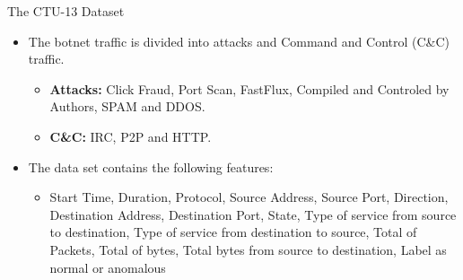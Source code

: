 \documentclass[newPxFont, numfooter, sectionpages]{beamer}
\begin{document}
\begin{frame}[c]{The CTU-13 Dataset}
	\begin{itemize}
		\item The botnet traffic is divided into attacks and Command and Control (C\&C) traffic.
		\begin{itemize}
			\item \textbf{Attacks:} Click Fraud, Port Scan, FastFlux, Compiled and Controled by Authors, SPAM and DDOS.
			\item \textbf{C\&C:} IRC, P2P and HTTP.
		\end{itemize}
		\item The data set contains the following features:
		\begin{itemize}
			\item Start Time, Duration, Protocol, Source Address, Source Port, Direction, Destination Address, Destination Port, State, Type of service from source to destination, Type of service from destination to source, Total of Packets, Total of bytes, Total bytes from source to destination, Label as normal or anomalous
		\end{itemize}
	\end{itemize}
\end{frame}
\end{document}

